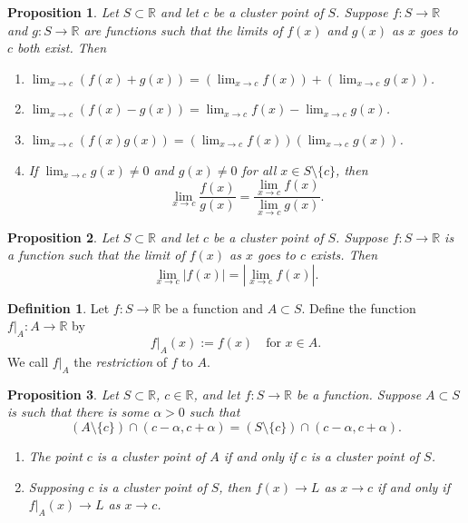 \documentclass{article}
\newtheorem{proposition}{Proposition}[section]
\theoremstyle{definition}
\newtheorem{definition}{Definition}[section]
\theoremstyle{remark}
\begin{document}
\begin{proposition}
Let $S \subset \mathbb{R}$ and let $c$ be a cluster point of $S$. Suppose $f : S \to \mathbb{R}$ and $g : S \to \mathbb{R}$ are functions such that the limits of $f(x)$ and $g(x)$ as $x$ goes to $c$ both exist. Then
\begin{enumerate}
\item $\lim_{x\to c} (f(x) + g(x)) = \left(\lim_{x\to c} f(x)\right) + \left(\lim_{x\to c} g(x)\right)$.
\item $\lim_{x\to c} (f(x) - g(x)) = \lim_{x\to c} f(x) - \lim_{x\to c} g(x)$.
\item $\lim_{x\to c} (f(x)g(x)) = \left(\lim_{x\to c} f(x)\right) \left(\lim_{x\to c} g(x)\right)$.
\item If $\lim_{x\to c} g(x) \neq 0$ and $g(x) \neq 0$ for all $x \in S \setminus \{c\}$, then
\[
\lim_{x\to c} \frac{f(x)}{g(x)} = \frac{\lim_{x\to c} f(x)}{\lim_{x\to c} g(x)}.
\]
\end{enumerate}
\end{proposition}

\begin{proposition}
Let $S \subset \mathbb{R}$ and let $c$ be a cluster point of $S$. Suppose $f : S \to \mathbb{R}$ is a function such that the limit of $f(x)$ as $x$ goes to $c$ exists. Then
\[
\lim_{x\to c} |f(x)| = \left| \lim_{x\to c} f(x) \right|.
\]
\end{proposition}

\begin{definition}
Let $f : S \to \mathbb{R}$ be a function and $A \subset S$. Define the function $f|_A : A \to \mathbb{R}$ by
\[
f|_A(x) := f(x) \quad \text{for } x \in A.
\]
We call $f|_A$ the \textit{restriction} of $f$ to $A$.
\end{definition}

\begin{proposition}
Let $S \subset \mathbb{R}$, $c \in \mathbb{R}$, and let $f : S \to \mathbb{R}$ be a function. Suppose $A \subset S$ is such that there is some $\alpha > 0$ such that
\[
(A \setminus \{c\}) \cap (c - \alpha, c + \alpha) = (S \setminus \{c\}) \cap (c - \alpha, c + \alpha).
\]
\begin{enumerate}
\item The point $c$ is a cluster point of $A$ if and only if $c$ is a cluster point of $S$.
\item Supposing $c$ is a cluster point of $S$, then $f(x) \to L$ as $x \to c$ if and only if $f|_A(x) \to L$ as $x \to c$.
\end{enumerate}
\end{proposition}
\end{document}
